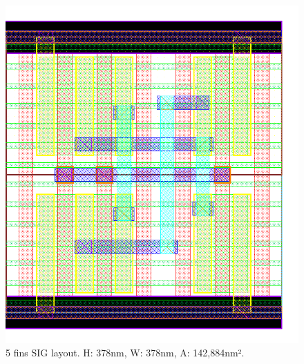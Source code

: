 \documentclass[pgmicro,diss,english]{iiufrgs}
\begin{document}
\begin{figure}[]
\centering
\includegraphics[width=\textwidth,height=\textheight,keepaspectratio]{SIG5F.png}
\caption{5 fins SIG layout. H: 378nm, W: 378nm, A: 142,884nm².}
\label{fig:SIG5F}
\end{figure}
\end{document}

